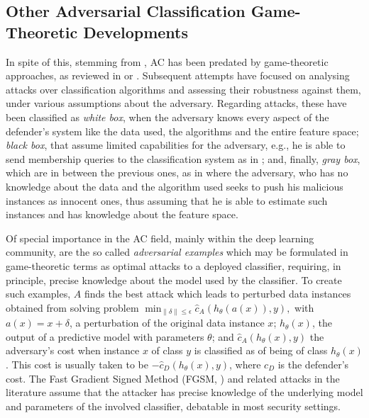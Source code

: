 
\subsection{Other Adversarial Classification Game-Theoretic Developments}\label{sec:other_AC}

In spite of this, stemming from 
\cite{adversarialClassification2004}, AC has been predated by game-theoretic approaches, as reviewed in \cite{biggio2014security} or \cite{li2014feature}.
Subsequent attempts have focused on analysing attacks over classification algorithms and assessing their robustness against them, %
under various assumptions about the adversary. Regarding attacks, these have been classified as {\em white box}, when
the adversary knows every aspect of the defender's system
like the data used, the algorithms and the entire feature space; 
{\em black box}, that assume limited capabilities for the adversary, e.g., he is able to send membership queries to the classification system as in
\cite{adversarialLearning2005}; and, finally,
{\em gray box}, which are in between the previous ones, as in \cite{zhou2012adversarial}
where the adversary, who has no knowledge about the data and the algorithm used
seeks to push his malicious instances
as innocent 
ones, thus assuming that he is able to estimate such instances and has knowledge about the feature space. 

Of special importance in the AC field, mainly 
within the deep learning community, are the so called {\em adversarial 
examples} \cite{goodfellow2014explaining} which may be formulated in game-theoretic terms as 
optimal attacks to a deployed classifier, requiring, in principle,
precise knowledge about the model used by the classifier.
To create such examples, $A$ finds the best attack which 
leads to perturbed data instances obtained from solving
problem   
$
\min_{\| \delta \| \leq \epsilon} \widehat{c}_A(h_{\theta} (a(x)), y),
$
 with $a(x) = x + \delta$, a  perturbation of the original data instance $x$; 
$h_{\theta} (x)$, the output of a predictive model with parameters $\theta$;
and
$\widehat{c}_A(h_{\theta} (x), y)$ the adversary's cost when instance $x$ of class $y$ is classified as of being of  class $h_\theta (x)$. This cost is usually taken to be $-\widehat{c}_D(h_{\theta} (x), y)$, where $c_D$ is the defender's cost.
The Fast Gradient Signed Method  (FGSM, \cite{goodfellow2014explaining}) and related attacks in the literature \cite{vorobeichikantar} assume that the attacker
has precise knowledge of the underlying model and parameters of the involved classifier, 
  debatable in most security settings.


